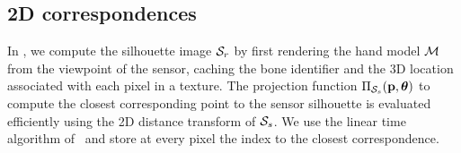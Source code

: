 %
%
%



\subsection*{2D correspondences}
In , we compute the silhouette image $\mathcal{S}_{r}$ by first rendering the hand model $\mathcal{M}$ from the viewpoint of the sensor, caching the bone identifier and the 3D location associated with each pixel in a texture.
The projection function $\Pi_{\mathcal{S}_{s}}(\mathbf{p},\boldsymbol{\theta})$ to compute the
 closest corresponding point to the sensor silhouette is evaluated efficiently using the 2D distance transform of $\mathcal{S}_{s}$.
 We use the linear time algorithm of~\cite{felzenszwalb_12} and store at every pixel the index to the closest correspondence.



